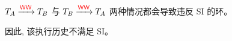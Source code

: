 \begin{frame}{}
  \begin{center}
		$T_{A} \xrightarrow{\textcolor{red}{\textup{\textsf{WW}}}} T_{B}$
		与 $T_{B} \xrightarrow{\textcolor{red}{\textup{\textsf{WW}}}} T_{A}$ 两种情况都会导致违反 SI 的环。

		\vspace{0.20cm}
		\vspace{0.20cm}

		因此, 该执行历史不满足 SI。
  \end{center}
\end{frame}






